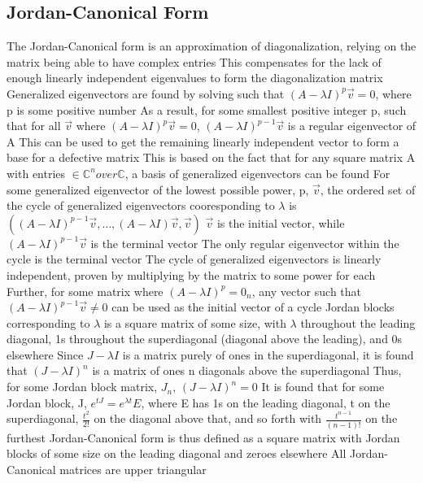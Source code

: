 \documentclass[11 pt, twoside]{article}
\newenvironment{outline*}
{
	\begin{outline}[enumerate]
	}
	{\end{outline}
}
\begin{document}
\subsection{Jordan-Canonical Form}
\begin{outline*}
\1 The Jordan-Canonical form is an approximation of diagonalization, relying on the matrix being able to have complex entries
\2 This compensates for the lack of enough linearly independent eigenvalues to form the diagonalization matrix
\1 Generalized eigenvectors are found by solving such that $(A - \lambda I)^p \vec{v} = 0$, where p is some positive number
\2 As a result, for some smallest positive integer p, such that for all $\vec{v}$ where $(A - \lambda I)^p \vec{v} = 0$, $(A - \lambda I)^{p-1}\vec{v}$ is a regular eigenvector of A
\2 This can be used to get the remaining linearly independent vector to form a base for a defective matrix
\3 This is based on the fact that for any square matrix A with entries $\in \mathbb{C}^n over \mathbb{C}$, a basis of generalized eigenvectors can be found
\2 For some generalized eigenvector of the lowest possible power, p, $\vec{v}$, the ordered set of the cycle of generalized eigenvectors cooresponding to $\lambda$ is $((A - \lambda I)^{p-1}\vec{v}, \dots, (A - \lambda I)\vec{v}, \vec{v})$
\3 $\vec{v}$ is the initial vector, while $(A - \lambda I)^{p-1}\vec{v}$ is the terminal vector
\3 The only regular eigenvector within the cycle is the terminal vector
\3 The cycle of generalized eigenvectors is linearly independent, proven by multiplying by the matrix to some power for each
\3 Further, for some matrix where $(A - \lambda I)^p = 0_n$, any vector such that $(A - \lambda I)^{p-1}\vec{v} \neq 0$ can be used as the initial vector of a cycle
\1 Jordan blocks corresponding to $\lambda$ is a square matrix of some size, with $\lambda$ throughout the leading diagonal, 1s throughout the superdiagonal (diagonal above the leading), and 0s elsewhere
\2 Since $J - \lambda I$ is a matrix purely of ones in the superdiagonal, it is found that $(J - \lambda I)^n$ is a matrix of ones n diagonals above the superdiagonal
\3 Thus, for some Jordan block matrix, $J_n$, $(J - \lambda I)^n = 0$
\2 It is found that for some Jordan block, J, $e^{tJ} = e^{\lambda t}E$, where E has 1s on the leading diagonal, t on the superdiagonal, $\frac{t^2}{2!}$ on the diagonal above that, and so forth with $\frac{t^{n-1}}{(n-1)!}$ on the furthest
\2 Jordan-Canonical form is thus defined as a square matrix with Jordan blocks of some size on the leading diagonal and zeroes elsewhere
\3 All Jordan-Canonical matrices are upper triangular

\end{outline*}
\end{document}

